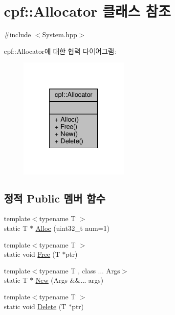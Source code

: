 \hypertarget{classcpf_1_1_allocator}{}\section{cpf\+:\+:Allocator 클래스 참조}
\label{classcpf_1_1_allocator}


{\ttfamily \#include $<$System.\+hpp$>$}



cpf\+:\+:Allocator에 대한 협력 다이어그램\+:\nopagebreak
\begin{figure}[H]
\begin{center}
\leavevmode
\includegraphics[width=154pt]{classcpf_1_1_allocator__coll__graph}
\end{center}
\end{figure}
\subsection*{정적 Public 멤버 함수}
\begin{DoxyCompactItemize}
\item 
{\footnotesize template$<$typename T $>$ }\\static T $\ast$ \hyperlink{classcpf_1_1_allocator_a3481cae5807aa57faf8ac9157bd5c618}{Alloc} (uint32\+\_\+t num=1)
\item 
{\footnotesize template$<$typename T $>$ }\\static void \hyperlink{classcpf_1_1_allocator_af63eadbfa53045d7eede980fd5d15eb4}{Free} (T $\ast$ptr)
\item 
{\footnotesize template$<$typename T , class ... Args$>$ }\\static T $\ast$ \hyperlink{classcpf_1_1_allocator_ab224979f67fae21e9db39b211a67b2e9}{New} (Args \&\&... args)
\item 
{\footnotesize template$<$typename T $>$ }\\static void \hyperlink{classcpf_1_1_allocator_a6c7808c532c47dc997deaf296aae4f27}{Delete} (T $\ast$ptr)
\end{DoxyCompactItemize}



